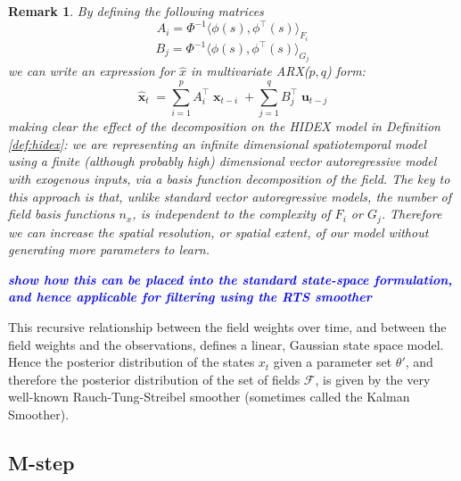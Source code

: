 \documentclass{IEEEtran}
\newcommand{\todo}[1]{\textsf{\emph{\textbf{\textcolor{blue}{#1}}}}}
\newcommand{\inner}[3]{\langle#1,#2\rangle_{#3}}
\DeclareMathOperator{\xvec}{\mathbf{x}}
\DeclareMathOperator{\uvec}{\mathbf{u}}
\newtheorem{remark}{Remark}
\begin{document}
\begin{remark}
	By defining the following matrices
	\begin{equation}
		A_i = \Phi^{-1} \inner{\phi(s)}{\phi^\top(s)}{F_i}
	\end{equation}
	\begin{equation}
		B_j = \Phi^{-1} \inner{\phi(s)}{\phi^\top(s)}{G_j}
	\end{equation}
	we can write an expression for $\hat{x}$ in multivariate ARX($p,q$) \cite{Ljung} form:
	\begin{equation}
		\label{eqn:arx}
		\hat{\xvec}_t = \sum_{i=1}^{p} A_i^\top \xvec_{t-i} +  \sum_{j=1}^{q} B_j^\top \uvec_{t-j}
	\end{equation}
	making clear the effect of the decomposition on the HIDEX model in Definition \ref{def:hidex}: we are representing an infinite dimensional spatiotemporal model using a finite (although probably high) dimensional vector autoregressive model with exogenous inputs, via a basis function decomposition of the field. The key to this approach is that, unlike standard vector autoregressive models, the number of field basis functions $n_x$, is independent to the complexity of $F_i$ or $G_j$. Therefore we can increase the spatial resolution, or spatial extent, of our model without generating more parameters to learn.
\end{remark}

\todo{show how this can be placed into the standard state-space formulation, and hence applicable for filtering using the RTS smoother}

This recursive relationship between the field weights over time, and between the field weights and the observations, defines a linear, Gaussian state space model. Hence the posterior distribution of the states $x_t$ given a parameter set $\theta'$, and therefore the posterior distribution of the set of fields $\mathcal{F}$, is given by the very well-known Rauch-Tung-Streibel smoother (sometimes called the Kalman Smoother).

\subsection{M-step}
\end{document}
